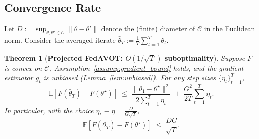 \documentclass[9pt]{extarticle}
\newtheorem{theorem}{Theorem}
\theoremstyle{definition}
\begin{document}
\subsection{Convergence Rate}
Let $D:=\sup_{\theta,\theta'\in\mathcal{C}}\|\theta-\theta'\|$ denote the (finite) diameter of $\mathcal{C}$ in the Euclidean norm. Consider the averaged iterate $\bar{\theta}_T := \frac{1}{T}\sum_{t=1}^T \theta_t$.
\begin{theorem}[\textbf{Projected FedAVOT: $O(1/\sqrt{T})$ suboptimality}]\label{thm:main}
Suppose $F$ is convex on $\mathcal{C}$, Assumption~\ref{assump:gradient_bound} holds, and the gradient estimator $g_t$ is unbiased (Lemma~\ref{lem:unbiased}). For any step sizes $\{\eta_t\}_{t=1}^T$,
\begin{equation}\label{eq:key-bound}
\mathbb{E}\!\left[F(\bar{\theta}_T) - F(\theta^\star)\right]
\;\le\;
\frac{\|\theta_1-\theta^\star\|^2}{2\sum_{t=1}^T \eta_t}
\;+\;
\frac{G^2}{2T}\sum_{t=1}^T \eta_t.
\end{equation}
In particular, with the choice $\eta_t \equiv \eta = \frac{D}{G\sqrt{T}}$,
\begin{equation}\label{eq:rate}
\mathbb{E}\!\left[F(\bar{\theta}_T) - F(\theta^\star)\right]
\;\le\; \frac{DG}{\sqrt{T}}.
\end{equation}
\end{theorem}
\end{document}
